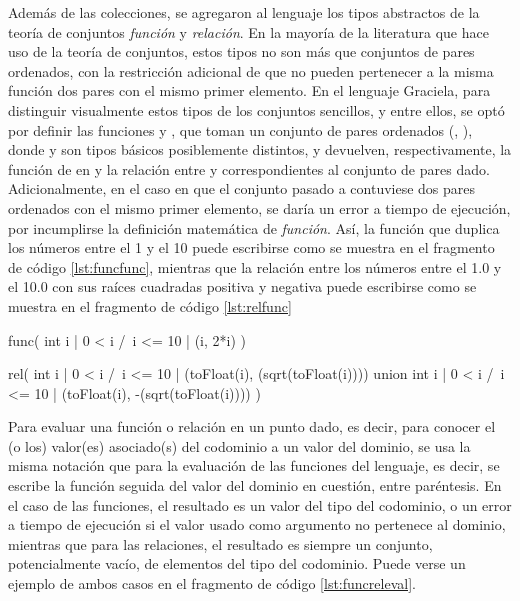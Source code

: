 Además de las colecciones, se agregaron al lenguaje los tipos abstractos de la
teoría de conjuntos \textit{función} y \textit{relación}. En la mayoría de la
literatura que hace uso de la teoría de conjuntos, estos tipos no son más que
conjuntos de pares ordenados, con la restricción adicional de que no pueden
pertenecer a la misma función dos pares con el mismo primer elemento. En el
lenguaje Graciela, para distinguir visualmente estos tipos de los conjuntos
sencillos, y entre ellos, se optó por definir las funciones  y
, que toman un conjunto de pares ordenados (, ),
donde  y  son tipos básicos posiblemente distintos, y
devuelven, respectivamente, la función de  en  y la relación
entre  y  correspondientes al conjunto de pares dado.
Adicionalmente, en el caso en que el conjunto pasado a  contuviese
dos pares ordenados con el mismo primer elemento, se daría un error a tiempo de
ejecución, por incumplirse la definición matemática de \textit{función}. Así, la
función que duplica los números entre el 1 y el 10 puede escribirse como se
muestra en el fragmento de código \ref{lst:funcfunc}, mientras que la relación
entre los números entre el 1.0 y el 10.0 con sus raíces cuadradas positiva y
negativa puede escribirse como se muestra en el fragmento de código
\ref{lst:relfunc}

\begin{gracielacode}[caption=Expresión de tipo \textit{función}, label=lst:funcfunc]
func({ int i | 0 < i /\ i <= 10 | (i, 2*i) })
\end{gracielacode}

\begin{gracielacode}[caption=Expresión de tipo \textit{relación}, label=lst:relfunc]
rel(
  { int i | 0 < i /\ i <= 10 |
    (toFloat(i),  (sqrt(toFloat(i))))
  } union
  { int i | 0 < i /\ i <= 10 |
    (toFloat(i), -(sqrt(toFloat(i))))
  }
)
\end{gracielacode}

Para evaluar una función o relación en un punto dado, es decir, para conocer el
(o los) valor(es) asociado(s) del codominio a un valor del dominio, se usa la
misma notación que para la evaluación de las funciones del lenguaje, es decir,
se escribe la función seguida del valor del dominio en cuestión, entre
paréntesis. En el caso de las funciones, el resultado es un valor del tipo del
codominio, o un error a tiempo de ejecución si el valor usado como argumento no
pertenece al dominio, mientras que para las relaciones, el resultado es siempre
un conjunto, potencialmente vacío, de elementos del tipo del codominio. Puede
verse un ejemplo de ambos casos en el fragmento de código \ref{lst:funcreleval}.

